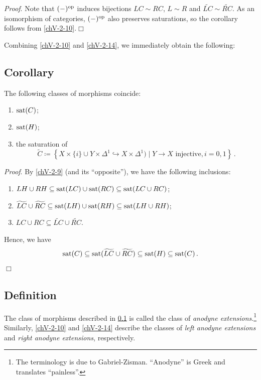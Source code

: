         \emph{Proof}. Note that $(-)^{\operatorname{op}}$ induces bijections $LC \sim RC$, $L \sim R$ and $\widetilde{LC} \sim \widetilde{RC}$. As an isomorphism of categories, $(-)^{\operatorname{op}}$ also preserves saturations, so the corollary follows from \ref{chV-2-10}.\hfill$\Box$
        \medskip

        Combining \ref{chV-2-10} and \ref{chV-2-14}, we immediately obtain the following:

    \subsection{Corollary}\label{chV-2-15}
        The following classes of morphisms coincide:
        \begin{enumerate}
            \item 
                $\operatorname{sat}(C)$;
            \item 
                $\operatorname{sat}(H)$;
            \item 
                the saturation of
                \begin{equation*}
                    \widetilde{C} \coloneq \left\{ X \times \{i\} \cup Y \times \Delta^1 \hookrightarrow X \times \Delta^1) \mid Y \to X \text{ injective}, i = 0,1 \right\} \,.
                \end{equation*}
        \end{enumerate}

        \emph{Proof}. By \ref{chV-2-9} (and its ``opposite''), we have the following inclusions:
        \begin{enumerate}
            \item 
                $LH \cup RH \subseteq \operatorname{sat}(LC) \cup \operatorname{sat}(RC) \subseteq \operatorname{sat}(LC \cup RC)$;
            \item 
                $\widetilde{LC} \cup \widetilde{RC} \subseteq \operatorname{sat}(LH) \cup \operatorname{sat}(RH) \subseteq \operatorname{sat}(LH \cup RH)$;
            \item 
                $LC \cup RC \subseteq \widetilde{LC} \cup \widetilde{RC}$.
        \end{enumerate}
        Hence, we have
        \begin{equation*}
            \operatorname{sat}(C) \subseteq \operatorname{sat}(\widetilde{LC} \cup \widetilde{RC}) \subseteq \operatorname{sat}(H) \subseteq \operatorname{sat}(C) \,.
        \end{equation*}\hfill$\Box$

    \subsection{Definition}\label{chV-2-16}
        The class of morphisms described in \ref{chV-2-15} is called the class of \emph{anodyne extensions}.\footnote{The terminology is due to Gabriel-Zisman. ``Anodyne'' is Greek and translates ``painless''.} Similarly, \ref{chV-2-10} and \ref{chV-2-14} describe the classes of \emph{left anodyne extensions} and \emph{right anodyne extensions}, respectively.
        \medskip

